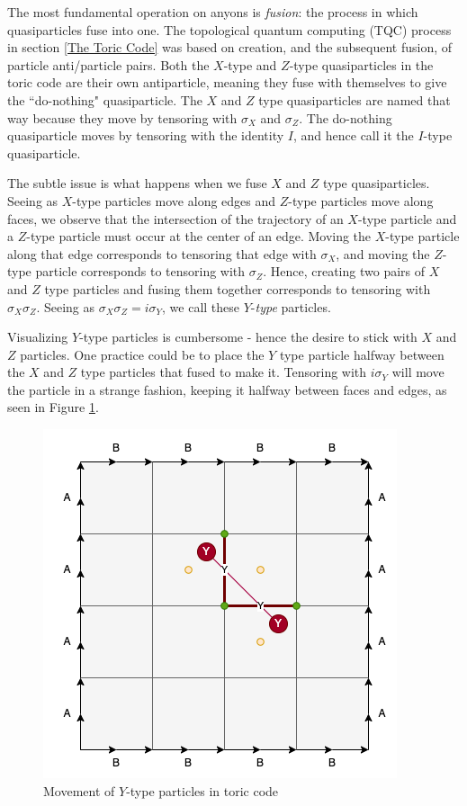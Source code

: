 \documentclass{article}
\theoremstyle{definition}
\numberwithin{figure}{section}
\begin{document}
The most fundamental operation on anyons is \textit{fusion}: the process in which quasiparticles fuse into one. The topological quantum computing (TQC) process in section \ref{The Toric Code} was based on creation, and the subsequent fusion, of particle anti/particle pairs. Both the $X$-type and $Z$-type quasiparticles in the toric code are their own antiparticle, meaning they fuse with themselves to give the ``do-nothing" quasiparticle. The $X$ and $Z$ type quasiparticles are named that way because they move by tensoring with $\sigma_X$ and $\sigma_Z$. The do-nothing quasiparticle moves by tensoring with the identity $I$, and hence call it the $I$-type quasiparticle.

The subtle issue is what happens when we fuse $X$ and $Z$ type quasiparticles. Seeing as $X$-type particles move along edges and $Z$-type particles move along faces, we observe that the intersection of the trajectory of an $X$-type particle and a $Z$-type particle must occur at the center of an edge. Moving the $X$-type particle along that edge corresponds to tensoring that edge with $\sigma_{X}$, and moving the $Z$-type particle corresponds to tensoring with $\sigma_{Z}$. Hence, creating two pairs of $X$ and $Z$ type particles and fusing them together corresponds to tensoring with $\sigma_X\sigma_Z$. Seeing as $\sigma_X\sigma_Z=i\sigma_Y$, we call these $Y$-\textit{type} particles.

Visualizing $Y$-type particles is cumbersome - hence the desire to stick with $X$ and $Z$ particles. One practice could be to place the $Y$ type particle halfway between the $X$ and $Z$ type particles that fused to make it. Tensoring with $i\sigma_Y$ will move the particle in a strange fashion, keeping it halfway between faces and edges, as seen in Figure \ref{fig:Y-type}.

\begin{figure}
\begin{center}
\includegraphics[scale=0.30]{Y-type}
\caption{Movement of $Y$-type particles in toric code}
\label{fig:Y-type}
\end{center}
\end{figure}
\end{document}
